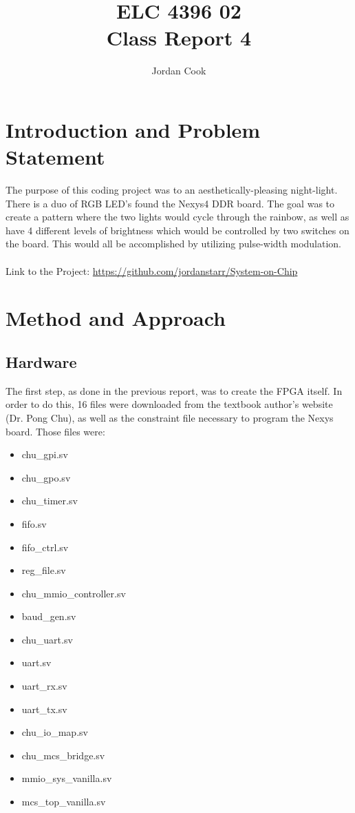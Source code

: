 \documentclass[11pt]{article}
\begin{document}
\title{ELC 4396 02 \\ Class Report 4}
\author{Jordan Cook}

\maketitle


\section{Introduction and Problem Statement} 

\quad The purpose of this coding project was to an aesthetically-pleasing night-light. There is a duo of RGB LED's found the Nexys4 DDR board. The goal was to create a pattern where the two lights would cycle through the rainbow, as well as have 4 different levels of brightness which would be controlled by two switches on the board. This would all be accomplished by utilizing pulse-width modulation.
\\\\ Link to the Project: \url{https://github.com/jordanstarr/System-on-Chip}

\section{Method and Approach}

\subsection{Hardware}

\quad The first step, as done in the previous report, was to create the FPGA itself. In order to do this, 16 files were downloaded from the textbook author's website (Dr. Pong Chu), as well as the constraint file necessary to program the Nexys board. Those files were: 

\begin{multicols}{2}
\begin{itemize}
	\item chu\_gpi.sv
	\item chu\_gpo.sv 
	\item chu\_timer.sv 
	\item fifo.sv 
	\item fifo\_ctrl.sv 
	\item reg\_file.sv
	\item chu\_mmio\_controller.sv 
	\item baud\_gen.sv 
	\item chu\_uart.sv 
	\item uart.sv 
	\item uart\_rx.sv 
	\item uart\_tx.sv 
	\item chu\_io\_map.sv 
	\item chu\_mcs\_bridge.sv 
	\item mmio\_sys\_vanilla.sv 
	\item mcs\_top\_vanilla.sv
\end{itemize}
\end{multicols} 
\end{document}
